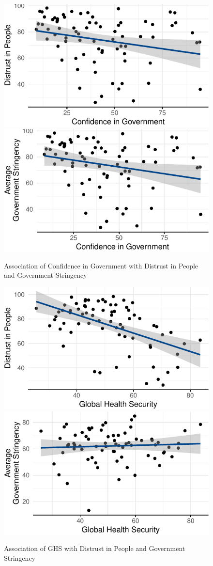 \documentclass[
  11pt,
]{article}
\begin{document}
\begin{figure}
\includegraphics[width=0.48\linewidth]{write_up_test_files/figure-latex/conf-plots-1} \includegraphics[width=0.48\linewidth]{write_up_test_files/figure-latex/conf-plots-2} \caption{Association of Confidence in Government with Distrust in People and Government Stringency}\label{fig:conf-plots}
\end{figure}

\hfill\break
\hfill\break

\begin{figure}
\includegraphics[width=0.48\linewidth]{write_up_test_files/figure-latex/ghs-plots-1} \includegraphics[width=0.48\linewidth]{write_up_test_files/figure-latex/ghs-plots-2} \caption{Association of GHS with Distrust in People and Government Stringency}\label{fig:ghs-plots}
\end{figure}
\end{document}
